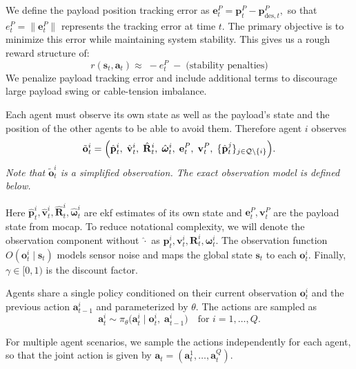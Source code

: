 We define the payload position tracking error as
$
\mathbf{e}^P_t = \mathbf{p}^P_t - \mathbf{p}^P_{\mathrm{des},t},
$
so that $e^P_t = \|\mathbf{e}^P_t\|$ represents the tracking error at time $t$. The primary objective is to minimize this error while maintaining system stability. This gives us a rough reward structure of:
\begin{equation}
 r(\mathbf{s}_t,\mathbf{a}_t) \approx\; - e^P_t \;-\; \text{(stability penalties)}
\end{equation}
We penalize payload tracking error and include additional terms to discourage large payload swing or cable-tension imbalance.

Each agent must observe its own state as well as the payload's state and the position of the other agents to be able to avoid them. Therefore agent $i$ observes
\begin{equation}
    \label{eq:obs}
    \tilde{\mathbf{o}}^i_t 
    = \Bigl(
      \hat{\mathbf{p}}^i_t,\;
      \hat{\mathbf{v}}^i_t,\;
      \hat{\mathbf{R}}^i_t,\;
      \hat{\boldsymbol{\omega}}^i_t,\;
      \mathbf{e}^P_t,\;
      \mathbf{v}^P_t,\;
      \{\hat{\mathbf{p}}^j_t\}_{j \in \mathcal{Q}\setminus\{i\}}
    \Bigr).
\end{equation}
\emph{Note that \(\tilde{\mathbf{o}}^i_t\) is a simplified observation. The exact observation model is defined below.}

Here $\hat{\mathbf{p}}^i_t,\hat{\mathbf{v}}^i_t,\hat{\mathbf{R}}^i_t,\hat{\boldsymbol{\omega}}^i_t$ are \gls{ekf} estimates of its own state and $\mathbf{e}^P_t,\mathbf{v}^P_t$ are the payload state from \gls{mocap}. To reduce notational complexity, we will denote the observation component without $\hat{\cdot}$ as $\mathbf{p}^i_t,\mathbf{v}^i_t,\mathbf{R}^i_t,\boldsymbol{\omega}^i_t$. The observation function $O(\mathbf{o}^i_t \mid \mathbf{s}_t)$ models sensor noise and maps the global state $\mathbf{s}_t$ to each $\mathbf{o}^i_t$. Finally, $\gamma \in [0,1)$ is the discount factor.

Agents share a single policy conditioned on their current observation \(\mathbf{o}^i_t\) and the previous action \(\mathbf{a}^i_{t-1}\) and parameterized by \(\theta\). The actions are sampled as
\begin{equation}
  \mathbf{a}^i_t \sim \pi_{\theta}\bigl(\mathbf{a}^i_t \mid \mathbf{o}^i_t,\;\mathbf{a}^i_{t-1}\bigr)
  \quad\text{for }i=1,\dots,Q.
\end{equation}


For multiple agent scenarios, we sample the actions independently for each agent, so that the joint action is given by $\mathbf{a}_t = (\mathbf{a}^1_t,\dots,\mathbf{a}^Q_t)$.


